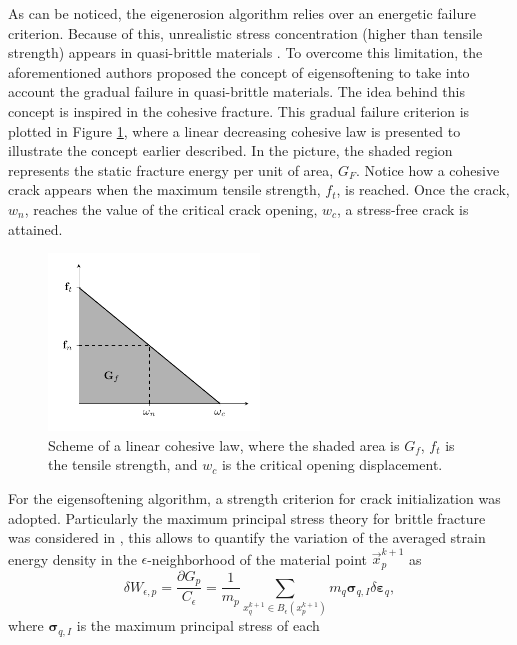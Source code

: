 \documentclass[preprint,12pt,a4paper]{elsarticle}
\newcommand{\tens}[1]{
  \ensuremath{\mathbf{{#1}}}
}
\begin{document}
As can be noticed, the eigenerosion algorithm relies over an energetic
failure criterion. Because of this, unrealistic stress
concentration (higher than tensile strength) appears in quasi-brittle
materials \cite{Navas_2017_ES}. To overcome this limitation, the
aforementioned authors proposed the concept of eigensoftening to take
into account the gradual failure in quasi-brittle materials. The idea
behind this concept is inspired in the cohesive fracture. This gradual
failure criterion is plotted in Figure \ref{fig:Damage-ft-wc}, where
a linear decreasing cohesive law is presented to illustrate the
concept earlier described. In the picture, the shaded region represents
the static fracture energy per unit of area, $G_F$. Notice how a
cohesive crack appears when the maximum tensile strength, $f_t$, is
reached. Once the crack, $w_n$, reaches the value of the critical
crack opening, $w_c$, a stress-free crack is attained.
\begin{figure}
  \centering
  \includegraphics[width=0.5\textwidth]{Figure-Damage}
  \caption{Scheme of a linear cohesive law, where the shaded area is
    $G_f$, $f_t$ is the tensile strength, and $w_c$ is the critical
    opening displacement.}
  \label{fig:Damage-ft-wc}
\end{figure}
For the eigensoftening algorithm, a strength criterion for crack
initialization was adopted. Particularly the maximum principal stress
theory for brittle fracture was considered in \cite{Navas_2017_ES},
this allows to quantify the variation of the averaged strain energy density in the
$\epsilon$-neighborhood of the material point $\vec{x}_p^{k+1}$ as
\begin{equation}
  \label{eq:variation-averaged-strain-energy-density}
  \delta W_{\epsilon,p} = \frac{\partial G_p}{C_{\epsilon}} =
  \frac{1}{m_p} \sum_{x_q^{k+1} \in
  B_{\epsilon}(x_p^{k+1})} m_q \tens{\sigma}_{q,I} \delta \tens{\varepsilon}_q,
\end{equation}
where $\tens{\sigma}_{q,I}$ is the maximum principal stress of each
\end{document}
